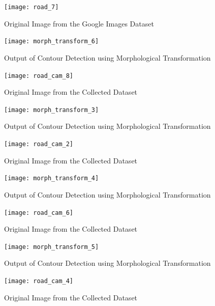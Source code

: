 \documentclass[12pt,a4paper]{article}
\begin{document}
\begin{enumerate}
\begin{enumerate}
    \begin{figure}[ht!]
        \centering
        \texttt{[image: road\_7]}
        \caption{Original Image from the Google Images Dataset}
    \end{figure}

    \begin{figure}[ht!]
        \centering
        \texttt{[image: morph\_transform\_6]}
        \caption{Output of Contour Detection using Morphological Transformation}
    \end{figure}
    \pagebreak
    
    \begin{figure}[ht!]
        \centering
        \texttt{[image: road\_cam\_8]}
        \caption{Original Image from the Collected Dataset}
    \end{figure}

    \begin{figure}[ht!]
        \centering
        \texttt{[image: morph\_transform\_3]}
        \caption{Output of Contour Detection using Morphological Transformation}
    \end{figure}
    \pagebreak
    
    \begin{figure}[ht!]
        \centering
        \texttt{[image: road\_cam\_2]}
        \caption{Original Image from the Collected Dataset}
    \end{figure}

    \begin{figure}[ht!]
        \centering
        \texttt{[image: morph\_transform\_4]}
        \caption{Output of Contour Detection using Morphological Transformation}
    \end{figure}
    \pagebreak
    
    \begin{figure}[ht!]
        \centering
        \texttt{[image: road\_cam\_6]}
        \caption{Original Image from the Collected Dataset}
    \end{figure}

    \begin{figure}[ht!]
        \centering
        \texttt{[image: morph\_transform\_5]}
        \caption{Output of Contour Detection using Morphological Transformation}
    \end{figure}
    \pagebreak
    
    \begin{figure}[ht!]
        \centering
        \texttt{[image: road\_cam\_4]}
        \caption{Original Image from the Collected Dataset}
    \end{figure}


\end{enumerate}
\end{enumerate}
\end{document}
